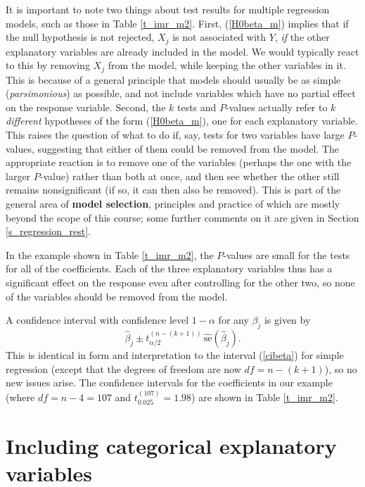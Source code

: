 It is important to note two things about test results for multiple
regression models, such as those in Table \ref{t_imr_m2}. First,
(\ref{H0beta_m}) implies that if the null hypothesis is not rejected,
$X_{j}$ is not associated with $Y$, \emph{if} the other explanatory
variables are already included in the model. We would typically react to
this by removing $X_{j}$ from the model, while keeping the
other variables in it. This is because of a general
principle that models should usually
be as simple (\emph{parsimonious}) as possible, and not include variables which
have no partial effect on the response variable. Second, the $k$ tests
and $P$-values actually refer to $k$ \emph{different} hypotheses of the
form (\ref{H0beta_m}), one for each explanatory variable. This raises
the question of what to do if, say, tests for two variables have large
$P$-values, suggesting that either of them could be removed from the
model. The appropriate reaction is to remove one of the variables
(perhaps the one with the larger $P$-value) rather than both at once,
and then see whether the other still remains nonsignificant (if so, it
can then also be removed). This is part of the general area of
\textbf{model selection}, principles and practice of which are mostly
beyond the scope of this course; some further comments on it are given
in Section \ref{s_regression_rest}.

In the example shown in Table \ref{t_imr_m2}, the $P$-values are small
for the tests for all of the coefficients. Each of the three explanatory
variables thus has a significant effect on the response even after
controlling for the other two, so none of the variables should be
removed from the model.

A confidence interval with
confidence level $1-\alpha$ for any $\beta_{j}$ is given by
\begin{equation}
\hat{\beta}_{j} \pm t_{\alpha/2}^{(n-(k+1))} \,
\hat{\text{se}}(\hat{\beta}_{j}).
\label{cibeta_m}
\end{equation}
This is identical in form and interpretation to the interval
(\ref{cibeta}) for simple regression (except that the degrees of freedom
are now $df=n-(k+1)$), so no new issues arise. The confidence intervals
for the coefficients in our example (where $df=n-4=107$ and
$t_{0.025}^{(107)}=1.98$) are shown in Table \ref{t_imr_m2}.

\section{Including categorical explanatory variables}
\label{s_regression_dummies}

